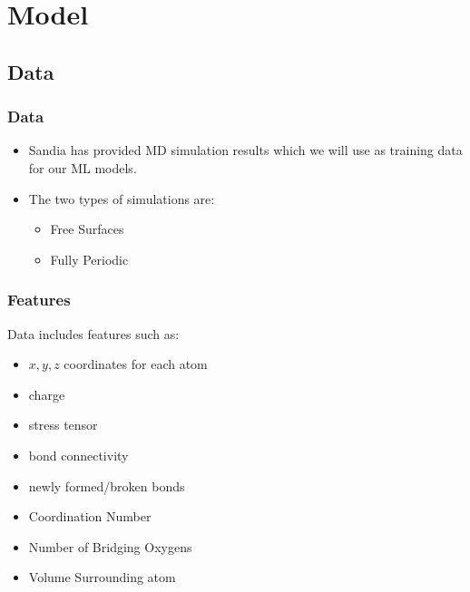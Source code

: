 





\section{Model}
\subsection{Data}
\frame
{
\frametitle{Data}
\begin{block}{}
\begin{itemize}
    \item
Sandia has provided MD simulation results which we will use as training data for our ML models. 
\end{itemize}


\end{block}

\begin{block}{}
\begin{itemize}
    \item The two types of simulations are:
    \begin{itemize}
        \item Free Surfaces
        \item Fully Periodic
    \end{itemize}
\end{itemize}
\end{block}
}
\frame
{
\frametitle{Features}
\begin{block}{}
Data includes features such as:
\begin{itemize}
    \item $x, y, z$ coordinates for each atom
    \item charge
    \item stress tensor
    \item bond connectivity
    \item newly formed/broken bonds
    \item Coordination Number
    \item Number of Bridging Oxygens
    \item Volume Surrounding atom
\end{itemize}
\end{block}
}
